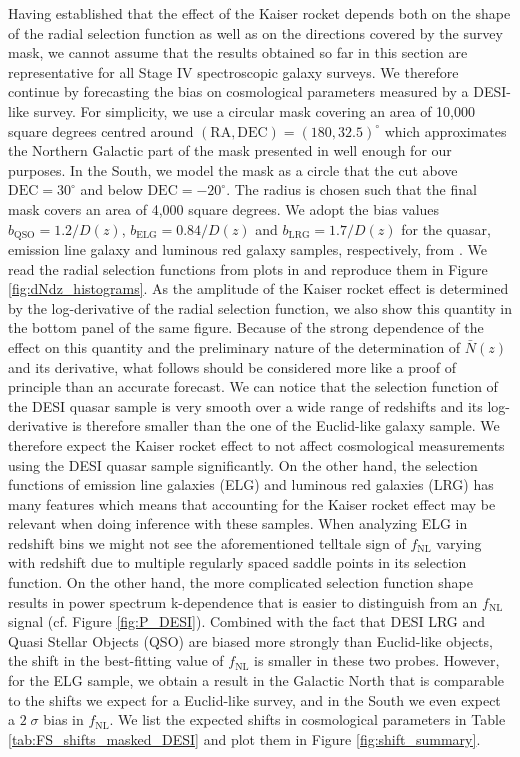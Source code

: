 \documentclass[a4paper,11pt]{article}
\begin{document}
Having established that the effect of the Kaiser rocket depends both on the shape of the radial selection function as well as on the directions covered by the survey mask, we cannot assume that the results obtained so far in this section are representative for all Stage IV spectroscopic galaxy surveys. We therefore continue by forecasting the bias on cosmological parameters measured by a DESI-like survey. For simplicity, we use a circular mask covering an area of 10,000 square degrees centred around $(\mathrm{RA, DEC})=(180,32.5)^\circ$ which approximates the Northern Galactic part of the mask presented in \cite{Dey:2018pfm} well enough for our purposes. In the South, we model the mask as a circle that the cut above $\mathrm{DEC} = 30^\circ$ and below $\mathrm{DEC} = -20^\circ$. The radius is chosen such that the final mask covers an area of 4,000 square degrees. We adopt the bias values $b_\mathrm{QSO} = 1.2/D(z)$, $b_\mathrm{ELG} = 0.84/D(z)$ and $b_\mathrm{LRG} = 1.7/D(z)$ for the quasar, emission line galaxy and luminous red galaxy samples, respectively, from \cite{Aghamousa:2016zmz}. We read the radial selection functions from plots in \cite{Raichoor:2020jcl,Yeche:2020tjm,Zhou:2020mgr} and reproduce them in Figure \ref{fig:dNdz_histograms}. As the amplitude of the Kaiser rocket effect is determined by the log-derivative of the radial selection function, we also show this quantity in the bottom panel of the same figure. Because of the strong dependence of the effect on this quantity and the preliminary nature of the determination of $\bar{N}(z)$ and its derivative, what follows should be considered more like a proof of principle than an accurate forecast. We can notice that the selection function of the DESI quasar sample is very smooth over a wide range of redshifts and its log-derivative is therefore smaller than the one of the Euclid-like galaxy sample. We therefore expect the Kaiser rocket effect to not affect cosmological measurements using the DESI quasar sample significantly. On the other hand, the selection functions of emission line galaxies (ELG) and luminous red galaxies (LRG) has many features which means that accounting for the Kaiser rocket effect may be relevant when doing inference with these samples. When analyzing ELG in redshift bins  we might not 
see the aforementioned telltale sign of $f_\mathrm{NL}$ varying with redshift due to multiple regularly spaced saddle points in its selection function. On the other hand, the more complicated selection function shape results in power spectrum k-dependence that is  easier to distinguish from an $f_\mathrm{NL}$ signal (cf. Figure \ref{fig:P_DESI}). Combined with the fact that DESI LRG  and Quasi Stellar Objects (QSO) are biased more strongly than Euclid-like objects, the shift in the best-fitting value of $f_\mathrm{NL}$ is smaller in these two probes. However, for the ELG sample, we obtain a result in the Galactic North that is comparable to the shifts we expect for a Euclid-like survey, and in the South we even expect a $2\;\sigma$ bias in $f_\mathrm{NL}$. We list the expected shifts in cosmological parameters in Table \ref{tab:FS_shifts_masked_DESI} and plot them in Figure \eqref{fig:shift_summary}. 
\end{document}
